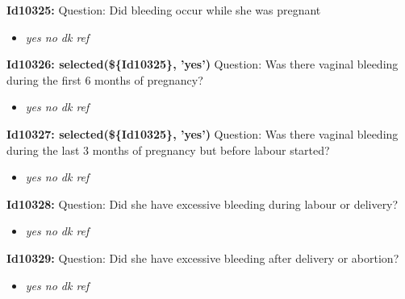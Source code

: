 \documentclass{article}%
\begin{document}
\textbf{Id10325: \newline%
}%
Question: Did bleeding occur while she was pregnant\newline%
%
\begin{itemize}%
\item%
\textit{yes\newline%
 no\newline%
 dk\newline%
 ref\newline%
}%
\end{itemize}%
\textbf{Id10326: selected(\$\{Id10325\}, 'yes')\newline%
}%
Question: Was there vaginal bleeding during the first 6 months of pregnancy?\newline%
%
\begin{itemize}%
\item%
\textit{yes\newline%
 no\newline%
 dk\newline%
 ref\newline%
}%
\end{itemize}%
\textbf{Id10327: selected(\$\{Id10325\}, 'yes')\newline%
}%
Question: Was there vaginal bleeding during the last 3 months of pregnancy but before labour started?\newline%
%
\begin{itemize}%
\item%
\textit{yes\newline%
 no\newline%
 dk\newline%
 ref\newline%
}%
\end{itemize}%
\textbf{Id10328: \newline%
}%
Question: Did she have excessive bleeding during labour or delivery?\newline%
%
\begin{itemize}%
\item%
\textit{yes\newline%
 no\newline%
 dk\newline%
 ref\newline%
}%
\end{itemize}%
\textbf{Id10329: \newline%
}%
Question: Did she have excessive bleeding after delivery or abortion?\newline%
%
\begin{itemize}%
\item%
\textit{yes\newline%
 no\newline%
 dk\newline%
 ref\newline%
}%
\end{itemize}%
\end{document}
